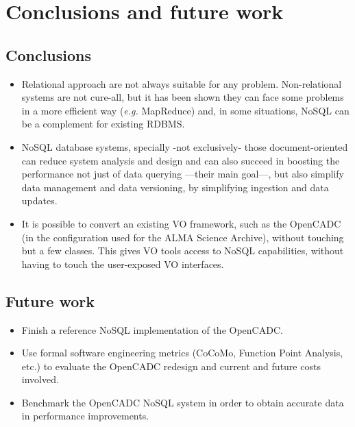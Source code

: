 \chapter{Conclusions and future work} %
\label{cha:conclusions_and_future_work}

\section{Conclusions} %
\label{sec:conclusions}

\begin{itemize}

\item Relational approach are not always suitable for any problem. Non-relational systems are not cure-all, but it has been shown they can face some problems in a more efficient way (\textit{e.g.} MapReduce) and, in some situations, NoSQL can be a complement for existing RDBMS.

\item NoSQL database systems, specially -not exclusively- those document-oriented can reduce system analysis and design and can also succeed in boosting the performance not just of data querying ---their main goal---, but also simplify data management and data versioning, by simplifying ingestion and data updates.

\item It is possible to convert an existing VO framework, such as the OpenCADC (in the configuration used for the ALMA Science Archive), without touching but a few classes. This gives VO tools access to NoSQL capabilities, without having to touch the user-exposed VO interfaces.

\end{itemize}


\section{Future work} %
\label{sec:future_work}

\begin{itemize}


\item Finish a reference NoSQL implementation of the OpenCADC.

\item %
Use %
formal
software engineering
metrics
(CoCoMo, Function Point Analysis, etc.) to
evaluate %
the
OpenCADC
redesign
and current and future costs involved.

\item Benchmark the OpenCADC NoSQL system
in order to obtain accurate data in performance improvements.

\end{itemize}



